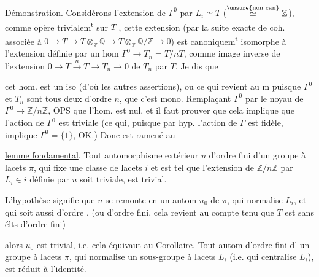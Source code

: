 \uline{Démonstration}. Considérons l'extension
 de $\Gamma^0$ par $L_i\simeq T$ ($\overset{\text{\unsure{non can}}}{\simeq}\mathbb Z$),
comme  opère trivialem\textsuperscript{t} sur $T$ , cette
extension (par la suite exacte de coh.
associée à $0\to T\to T\otimes_{\mathbb Z}\mathbb Q\to T\otimes_{\mathbb Z}\mathbb Q/\mathbb Z\to0$)
est canoniquem\textsuperscript{t} isomorphe à  l'extension
définie par un hom $\Gamma^0\to T_n=T/nT$,
comme image inverse de l'extension
$0\to T\xrightarrow{n}T\to T_n\to0$ de $T_n$ par $T$. Je dis que


cet hom. est un iso (d'où 
les autres assertions), ou ce qui revient
au $\overline{\mathrm m}$ puisque $\Gamma^0$ et $T_n$ sont tous
deux d'ordre $n$, que c'est mono.
Remplaçant $\Gamma^0$ par le noyau de $\Gamma^0\to\mathbb Z/n\mathbb Z$,
OPS que l'hom.  est nul, et il faut
prouver que cela implique que l'action
de $\Gamma^0$ est triviale (ce qui, puisque par hyp.
l'action de $\Gamma$ est fidèle, implique $\Gamma^0=\{1\}$,
OK.) Donc  est ramené au

\uline{lemme fondamental}. Tout automorphisme 
extérieur $u$ d'ordre fini  d'un groupe à
lacets $\pi$, qui fixe une classe de lacets
$i$ et est tel que l'extension de $\mathbb Z/n\mathbb Z$
par $L_i\in i$ définie par $u$ soit triviale,
est trivial.

L'hypothèse signifie que $u$ se remonte
en un autom $u_0$ de $\pi$, qui
normalise $L_i$, et qui soit aussi d'ordre ,
(ou d'ordre fini, cela revient au  compte tenu
que  $T$ est sans élts d'ordre fini)


alors $u_0$ est trivial, i.e. cela équivaut au
\uline{Corollaire}. Tout autom  d'ordre fini  d'
un groupe à lacets $\pi$,  qui normalise
un sous-groupe à lacets $L_i$ (i.e. qui
centralise $L_i$), est réduit à l'identité.

